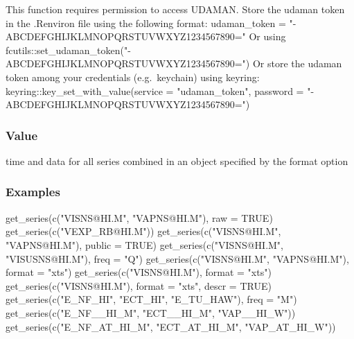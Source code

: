 \documentclass[
  letterpaper,
  DIV=11,
  numbers=noendperiod]{scrreport}
\newenvironment{Shaded}{\begin{snugshade}}{\end{snugshade}}
\newcommand{\AttributeTok}[1]{\textcolor[rgb]{0.40,0.45,0.13}{#1}}
\newcommand{\ConstantTok}[1]{\textcolor[rgb]{0.56,0.35,0.01}{#1}}
\newcommand{\FunctionTok}[1]{\textcolor[rgb]{0.28,0.35,0.67}{#1}}
\newcommand{\NormalTok}[1]{\textcolor[rgb]{0.00,0.23,0.31}{#1}}
\newcommand{\StringTok}[1]{\textcolor[rgb]{0.13,0.47,0.30}{#1}}
\begin{document}
This function requires permission to access UDAMAN. Store the udaman
token in the .Renviron file using the following format: udaman\_token =
"-ABCDEFGHIJKLMNOPQRSTUVWXYZ1234567890=" Or using
fcutils::set\_udaman\_token("-ABCDEFGHIJKLMNOPQRSTUVWXYZ1234567890=") Or
store the udaman token among your credentials (e.g.~keychain) using
keyring: keyring::key\_set\_with\_value(service = "udaman\_token",
password = "-ABCDEFGHIJKLMNOPQRSTUVWXYZ1234567890=")

\subsubsection{Value}\label{value}

time and data for all series combined in an object specified by the
format option

\subsubsection{Examples}\label{examples}

\begin{Shaded}
\begin{Highlighting}[]
\FunctionTok{get\_series}\NormalTok{(}\FunctionTok{c}\NormalTok{(}\StringTok{"VISNS@HI.M"}\NormalTok{, }\StringTok{"VAPNS@HI.M"}\NormalTok{), }\AttributeTok{raw =} \ConstantTok{TRUE}\NormalTok{)}
\FunctionTok{get\_series}\NormalTok{(}\FunctionTok{c}\NormalTok{(}\StringTok{"VEXP\_RB@HI.M"}\NormalTok{))}
\FunctionTok{get\_series}\NormalTok{(}\FunctionTok{c}\NormalTok{(}\StringTok{"VISNS@HI.M"}\NormalTok{, }\StringTok{"VAPNS@HI.M"}\NormalTok{), }\AttributeTok{public =} \ConstantTok{TRUE}\NormalTok{)}
\FunctionTok{get\_series}\NormalTok{(}\FunctionTok{c}\NormalTok{(}\StringTok{"VISNS@HI.M"}\NormalTok{, }\StringTok{"VISUSNS@HI.M"}\NormalTok{), }\AttributeTok{freq =} \StringTok{"Q"}\NormalTok{)}
\FunctionTok{get\_series}\NormalTok{(}\FunctionTok{c}\NormalTok{(}\StringTok{"VISNS@HI.M"}\NormalTok{, }\StringTok{"VAPNS@HI.M"}\NormalTok{), }\AttributeTok{format =} \StringTok{"xts"}\NormalTok{)}
\FunctionTok{get\_series}\NormalTok{(}\FunctionTok{c}\NormalTok{(}\StringTok{"VISNS@HI.M"}\NormalTok{), }\AttributeTok{format =} \StringTok{"xts"}\NormalTok{)}
\FunctionTok{get\_series}\NormalTok{(}\FunctionTok{c}\NormalTok{(}\StringTok{"VISNS@HI.M"}\NormalTok{), }\AttributeTok{format =} \StringTok{"xts"}\NormalTok{, }\AttributeTok{descr =} \ConstantTok{TRUE}\NormalTok{)}
\FunctionTok{get\_series}\NormalTok{(}\FunctionTok{c}\NormalTok{(}\StringTok{"E\_NF\_HI"}\NormalTok{, }\StringTok{"ECT\_HI"}\NormalTok{, }\StringTok{"E\_TU\_HAW"}\NormalTok{), }\AttributeTok{freq =} \StringTok{"M"}\NormalTok{)}
\FunctionTok{get\_series}\NormalTok{(}\FunctionTok{c}\NormalTok{(}\StringTok{"E\_NF\_\_HI\_M"}\NormalTok{, }\StringTok{"ECT\_\_HI\_M"}\NormalTok{, }\StringTok{"VAP\_\_HI\_W"}\NormalTok{))}
\FunctionTok{get\_series}\NormalTok{(}\FunctionTok{c}\NormalTok{(}\StringTok{"E\_NF\_AT\_HI\_M"}\NormalTok{, }\StringTok{"ECT\_AT\_HI\_M"}\NormalTok{, }\StringTok{"VAP\_AT\_HI\_W"}\NormalTok{))}
\end{Highlighting}
\end{Shaded}
\end{document}
